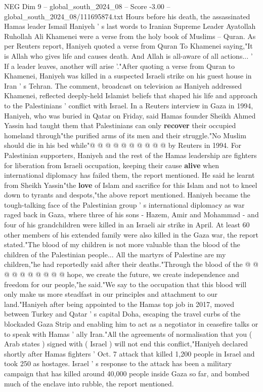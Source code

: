 \begin{textsample}{NEG Dim 9 – global\_south\_2024\_08 – Score -3.00 – global\_south\_2024\_08/111695874.txt}  \label{ex:f9_neg_389}
Hours before his death, the assassinated Hamas leader Ismail Haniyeh ' s last words to Iranian Supreme Leader Ayatollah Ruhollah Ali Khamenei were a verse from the holy book of Muslims -- Quran.
As per Reuters report, Haniyeh quoted a verse from Quran To Khamenei saying,"It is Allah who gives life and causes death.
And Allah is all-aware of all actions... ' If a leader leaves, another will arise '."After quoting a verse from Quran to Khamenei, Haniyeh was killed in a suspected Israeli strike on his guest house in Iran ' s Tehran.
The comment, broadcast on television as Haniyeh addressed Khamenei, reflected deeply-held Islamist beliefs that shaped his life and approach to the Palestinians ' conflict with Israel.
In a Reuters interview in Gaza in 1994, Haniyeh, who was buried in Qatar on Friday, said Hamas founder Sheikh Ahmed Yassin had taught them that Palestinians can only \textbf{recover} their occupied homeland through"the purified arms of its men and their struggle."No Muslim should die in his bed while"@ @ @ @ @ @ @ @ @ @ by Reuters in 1994.
For Palestinian supporters, Haniyeh and the rest of the Hamas leadership are fighters for liberation from Israeli occupation, keeping their cause \textbf{alive} when international diplomacy has failed them, the report mentioned.
He said he learnt from Sheikh Yassin"the \textbf{love} of Islam and sacrifice for this Islam and not to kneel down to tyrants and despots,"the above report mentioned.
Haniyeh became the tough-talking face of the Palestinian group ' s international diplomacy as war raged back in Gaza, where three of his sons - Hazem, Amir and Mohammad - and four of his grandchildren were killed in an Israeli air strike in April.
At least 60 other members of his extended family were also killed in the Gaza war, the report stated."The blood of my children is not more valuable than the blood of the children of the Palestinian people...
All the martyrs of Palestine are my children,"he had reportedly said after their deaths."Through the blood of the @ @ @ @ @ @ @ @ @ @ hope, we create the future, we create independence and freedom for our people,"he said."We say to the occupation that this blood will only make us more steadfast in our principles and attachment to our land."Haniyeh after being appointed to the Hamas top job in 2017, moved between Turkey and Qatar ' s capital Doha, escaping the travel curbs of the blockaded Gaza Strip and enabling him to act as a negotiator in ceasefire talks or to speak with Hamas ' ally Iran."All the agreements of normalisation that you ( Arab states ) signed with ( Israel ) will not end this conflict,"Haniyeh declared shortly after Hamas fighters ' Oct. 7 attack that killed 1,200 people in Israel and took 250 as hostages.
Israel ' s response to the attack has been a military campaign that has killed around 40,000 people inside Gaza so far, and bombed much of the enclave into rubble, the report mentioned.

\end{textsample}
